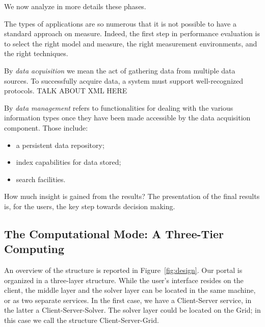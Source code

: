 \documentclass[11pt,relax]{SANDreport}
\begin{document}
We now analyze in more details these phases.

The types of applications
are so numerous that it is not possible to have a standard approach on
measure. Indeed, the first step in performance evaluation is to select the
right model and measure, the right measurement environments, and the right
techniques.

By {\sl data acquisition} we mean the act of gathering data from multiple data
sources. To successfully acquire data, a system must support well-recognized
protocols. TALK ABOUT XML HERE

By {\sl data management} refers to functionalities for dealing with the various
information types once they have been made accessible by the data acquisition
component. Those include:
\begin{itemize}
\item a persistent data repository;
\item index capabilities for data stored;
\item search facilities.
\end{itemize}


How much insight is gained from the results? The presentation of the final
results is, for the users, the key step towards decision making. 

\subsection{The Computational Mode: A Three-Tier Computing}

An overview of the structure is reported in Figure~\ref{fig:design}.
Our portal is organized in a three-layer structure. While the user's interface
resides on the client, the middle layer and the solver layer can be located in
the same machine, or as two separate services. In the first case, we have a
Client-Server service, in the latter a Client-Server-Solver. The solver layer
could be located on the Grid; in this case we call the structure
Client-Server-Grid.
\end{document}
